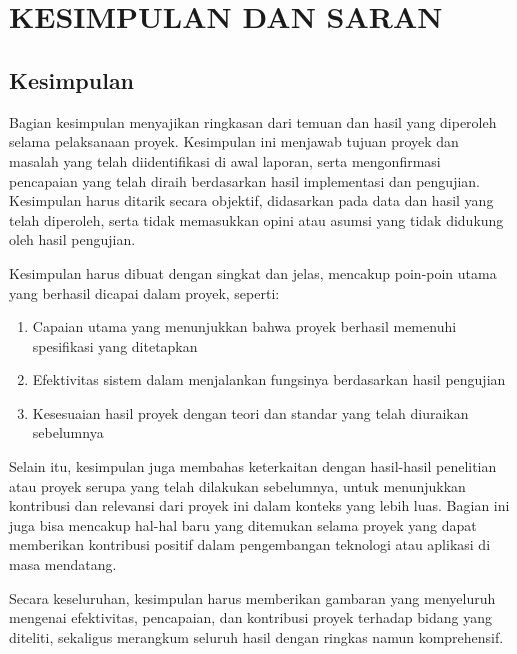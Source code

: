 
\chapter[KESIMPULAN DAN SARAN]{\\ KESIMPULAN DAN SARAN}

\section{Kesimpulan}
\begin{sectioncontent}
    \hspace{\parindent}Bagian kesimpulan menyajikan ringkasan dari temuan dan hasil yang diperoleh selama pelaksanaan proyek. Kesimpulan ini menjawab tujuan proyek dan masalah yang telah diidentifikasi di awal laporan, serta mengonfirmasi pencapaian yang telah diraih berdasarkan hasil implementasi dan pengujian. Kesimpulan harus ditarik secara objektif, didasarkan pada data dan hasil yang telah diperoleh, serta tidak memasukkan opini atau asumsi yang tidak didukung oleh hasil pengujian.
    
    Kesimpulan harus dibuat dengan singkat dan jelas, mencakup poin-poin utama yang berhasil dicapai dalam proyek, seperti:
    \begin{enumerate}[leftmargin=0.5cm,label=\alph*.]
        \item Capaian utama yang menunjukkan bahwa proyek berhasil memenuhi spesifikasi yang ditetapkan
        \item Efektivitas sistem dalam menjalankan fungsinya berdasarkan hasil pengujian
        \item Kesesuaian hasil proyek dengan teori dan standar yang telah diuraikan sebelumnya
    \end{enumerate}

    Selain itu, kesimpulan juga membahas keterkaitan dengan hasil-hasil penelitian atau proyek serupa yang telah dilakukan sebelumnya, untuk menunjukkan kontribusi dan relevansi dari proyek ini dalam konteks yang lebih luas. Bagian ini juga bisa mencakup hal-hal baru yang ditemukan selama proyek yang dapat memberikan kontribusi positif dalam pengembangan teknologi atau aplikasi di masa mendatang.
    
    Secara keseluruhan, kesimpulan harus memberikan gambaran yang menyeluruh mengenai efektivitas, pencapaian, dan kontribusi proyek terhadap bidang yang diteliti, sekaligus merangkum seluruh hasil dengan ringkas namun komprehensif.
\end{sectioncontent}


